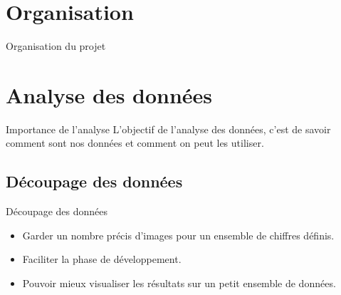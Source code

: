 \documentclass[10pt,handout]{beamer}
\begin{document}
\section{Organisation}
\begin{frame}{Organisation du projet}
    
\end{frame}

\section{Analyse des données}
\begin{frame}
    \begin{block}{Importance de l'analyse}
        L'objectif de l'analyse des données, c'est de savoir comment sont nos données et comment on peut les utiliser.
    \end{block}
\end{frame}
 

\subsection{Découpage des données}

\begin{frame}{Découpage des données}
    \begin{itemize}
        \item Garder un nombre précis d’images pour un ensemble de chiffres définis.
        \item Faciliter la phase de développement.
        \item Pouvoir mieux visualiser les résultats sur un petit
        ensemble de données.
    \end{itemize}
\end{frame}
\end{document}
